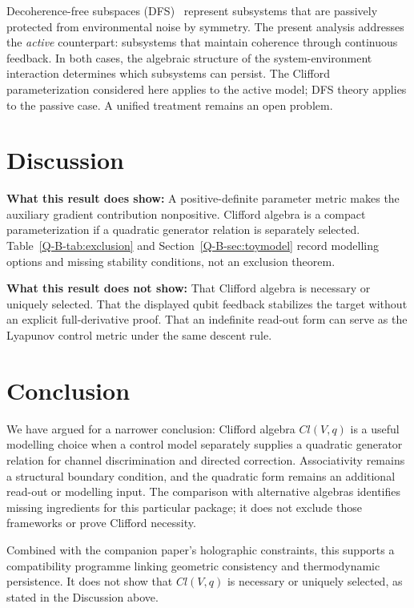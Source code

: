 \documentclass[12pt,a4paper,openany]{book}
\begin{document}
Decoherence-free subspaces (DFS)~\cite{Zanardi2001,Lidar2003} represent subsystems that are passively protected from environmental noise by symmetry.
The present analysis addresses the \emph{active} counterpart: subsystems that maintain coherence through continuous feedback.
In both cases, the algebraic structure of the system-environment interaction determines which subsystems can persist.
The Clifford parameterization considered here applies to the active model; DFS theory applies to the passive case.
A unified treatment remains an open problem.

\section{Discussion}

\textbf{What this result does show:}
A positive-definite parameter metric makes the auxiliary gradient contribution nonpositive.  Clifford algebra is a compact parameterization if a quadratic generator relation is separately selected.  Table~\ref{Q-B-tab:exclusion} and Section~\ref{Q-B-sec:toymodel} record modelling options and missing stability conditions, not an exclusion theorem.

\textbf{What this result does not show:}
That Clifford algebra is necessary or uniquely selected.
That the displayed qubit feedback stabilizes the target without an explicit full-derivative proof.
That an indefinite read-out form can serve as the Lyapunov control metric under the same descent rule.

\section{Conclusion}

We have argued for a narrower conclusion: Clifford algebra $Cl(V,q)$ is
a useful modelling choice when a control model separately supplies a
quadratic generator relation for channel discrimination and directed
correction.  Associativity remains a structural boundary condition, and
the quadratic form remains an additional read-out or modelling input.
The comparison with alternative algebras identifies missing ingredients
for this particular package; it does not exclude those frameworks or
prove Clifford necessity.

Combined with the companion paper's holographic constraints, this
supports a compatibility programme linking geometric consistency and
thermodynamic persistence.  It does not show that $Cl(V,q)$ is necessary
or uniquely selected, as stated in the Discussion above.
\end{document}

